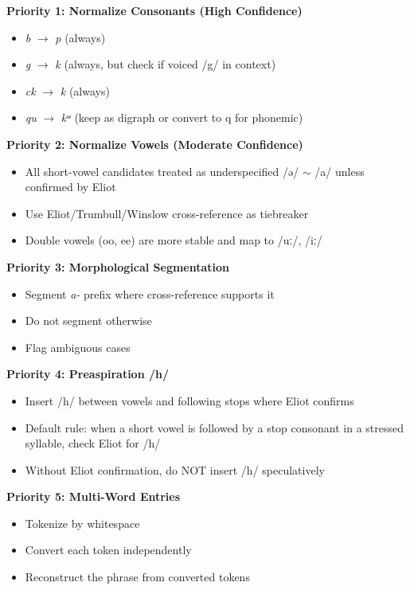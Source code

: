 \textbf{Priority 1: Normalize Consonants (High Confidence)}

\begin{itemize}
  \item \emph{b} $\rightarrow$ \emph{p} (always)
  \item \emph{g} $\rightarrow$ \emph{k} (always, but check if voiced /g/ in
    context)
  \item \emph{ck} $\rightarrow$ \emph{k} (always)
  \item \emph{qu} $\rightarrow$ \emph{kʷ} (keep as digraph or convert to q for
    phonemic)
\end{itemize}

\textbf{Priority 2: Normalize Vowels (Moderate Confidence)}

\begin{itemize}
  \item All short-vowel candidates treated as underspecified /ə/ $\sim$ /a/
    unless confirmed by Eliot
  \item Use Eliot/Trumbull/Winslow cross-reference as tiebreaker
  \item Double vowels (oo, ee) are more stable and map to /uː/, /iː/
\end{itemize}

\textbf{Priority 3: Morphological Segmentation}

\begin{itemize}
  \item Segment \emph{a-} prefix where cross-reference supports it
  \item Do not segment otherwise
  \item Flag ambiguous cases
\end{itemize}

\textbf{Priority 4: Preaspiration /h/}

\begin{itemize}
  \item Insert /h/ between vowels and following stops where Eliot confirms
  \item Default rule: when a short vowel is followed by a stop consonant in a
    stressed syllable, check Eliot for /h/
  \item Without Eliot confirmation, do NOT insert /h/ speculatively
\end{itemize}

\textbf{Priority 5: Multi-Word Entries}

\begin{itemize}
  \item Tokenize by whitespace
  \item Convert each token independently
  \item Reconstruct the phrase from converted tokens
\end{itemize}

